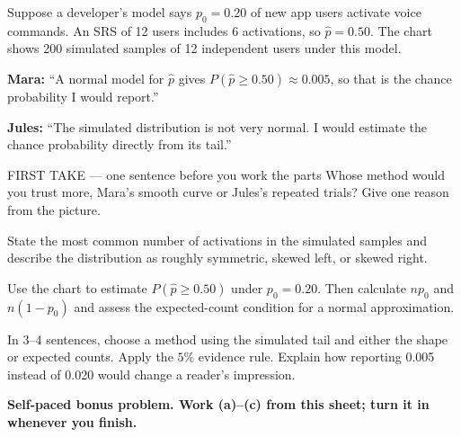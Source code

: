 \documentclass[14pt]{extarticle}
\begin{document}
\pagestyle{empty}


\noindent\begin{minipage}[t]{0.57\linewidth}
\vspace{0pt}
Suppose a developer's model says $p_0=0.20$ of new app users activate voice commands. An SRS of 12 users includes 6 activations, so $\hat p=0.50$. The chart shows 200 simulated samples of 12 independent users under this model.\par\smallskip \textbf{Mara:} ``A normal model for $\hat p$ gives $P(\hat p\ge 0.50)\approx0.005$, so that is the chance probability I would report.''\par \textbf{Jules:} ``The simulated distribution is not very normal. I would estimate the chance probability directly from its tail.''\par
\end{minipage}\hfill
\begin{minipage}[t]{0.40\linewidth}
\vspace{0pt}
\begin{center}
\end{center}
\end{minipage}

\begin{firsttakebox}{FIRST TAKE --- one sentence before you work the parts}
Whose method would you trust more, Mara's smooth curve or Jules's repeated trials? Give one reason from the picture.
\end{firsttakebox}

\begin{description}[leftmargin=1.15in, labelwidth=1in, itemsep=2pt, topsep=2pt]
  \item[\dokbadge{1}~(a)] State the most common number of activations in the simulated samples and describe the distribution as roughly symmetric, skewed left, or skewed right.
  \item[\dokbadge{2}~(b)] Use the chart to estimate $P(\hat p\ge0.50)$ under $p_0=0.20$. Then calculate $np_0$ and $n(1-p_0)$ and assess the expected-count condition for a normal approximation.
  \item[\dokbadge{3}~(c)] In 3--4 sentences, choose a method using the simulated tail and either the shape or expected counts. Apply the $5\%$ evidence rule. Explain how reporting 0.005 instead of 0.020 would change a reader's impression.
\end{description}

\vfill
\textbf{Self-paced bonus problem. Work (a)--(c) from this sheet; turn it in whenever you finish.}
\end{document}
